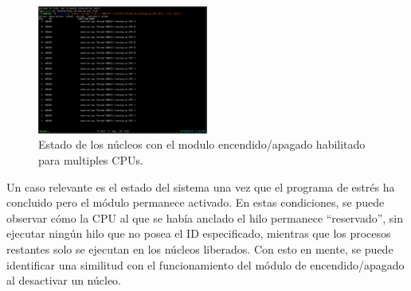 \begin{figure}[H]
    \centering
    \includegraphics[width=0.5\textwidth]{images/cpuMonopolized-dtrace.png}
    \caption{Estado de los núcleos con el modulo encendido/apagado habilitado para multiples CPUs.}
    \label{fig:cpuMonopolized-dtrace}
\end{figure}






Un caso relevante es el estado del sistema una vez que el programa de estrés ha concluido pero el módulo permanece activado. En estas condiciones, se puede observar cómo la CPU al que se había anclado el hilo permanece “reservado”, sin ejecutar ningún hilo que no posea el ID especificado, mientras que los procesos restantes solo se ejecutan en los núcleos liberados. Con esto en mente, se puede identificar una similitud con el funcionamiento del módulo de encendido/apagado al desactivar un núcleo.\par

